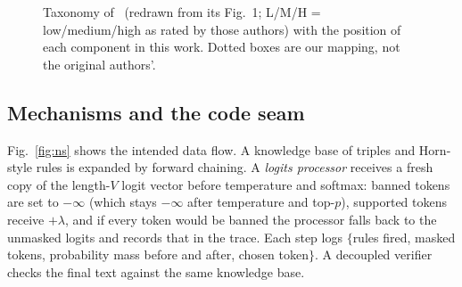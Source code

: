 \documentclass[conference]{IEEEtran}
\begin{document}
\begin{figure}[t]
\caption{Taxonomy of~\cite{sheth2023} (redrawn from its Fig.~1; L/M/H = low/medium/high as rated by those authors) with the position of each component in this work. Dotted boxes are our mapping, not the original authors'.}
\label{fig:taxonomy}
\end{figure}

\subsection{Mechanisms and the code seam}
Fig.~\ref{fig:ns} shows the intended data flow. A knowledge base of triples and Horn-style rules is expanded by forward chaining. A \emph{logits processor} receives a fresh copy of the length-$V$ logit vector before temperature and softmax: banned tokens are set to $-\infty$ (which stays $-\infty$ after temperature and top-$p$), supported tokens receive $+\lambda$, and if every token would be banned the processor falls back to the unmasked logits and records that in the trace. Each step logs $\{$rules fired, masked tokens, probability mass before and after, chosen token$\}$. A decoupled verifier checks the final text against the same knowledge base.
\end{document}
